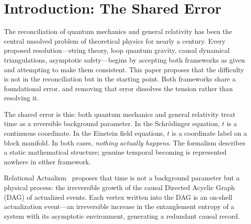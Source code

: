 \documentclass[11pt,a4paper]{article}
\theoremstyle{plain}
\theoremstyle{definition}
\theoremstyle{remark}
\begin{document}
\begin{abstract}
\medskip\noindent
\textbf{Keywords:} Quantum gravity \textperiodcentered{} Causal set theory
\textperiodcentered{} Quantum measure \textperiodcentered{} Causal invariance
\textperiodcentered{} Process ontology \textperiodcentered{}
Bose-Marletto-Vedral \textperiodcentered{} Relational Actualism
\textperiodcentered{} Benincasa-Dowker \textperiodcentered{} Poisson-CSG

\bigskip
\noindent\textbf{New result:} The BDG causal action identifies five
self-similar vertex topology classes that exactly match the Standard Model
particle classification. Confinement of topological classes (quarks and gluons)
with finite BDG-filtration lengths $L=3$ (gluon) and $L=4$ (quark) is proved
via exhaustive extension classification. These results are developed in full in
the companion paper \emph{Relational Actualism: The Topology of Matter}
.

\end{abstract}

\newpage

\section{Introduction: The Shared Error}
\label{sec:intro}

The reconciliation of quantum mechanics and general relativity has been the
central unsolved problem of theoretical physics for nearly a century. Every
proposed resolution---string theory, loop quantum gravity, causal dynamical
triangulations, asymptotic safety---begins by accepting both frameworks as given
and attempting to make them consistent. This paper proposes that the difficulty
is not in the reconciliation but in the starting point. Both frameworks share a
foundational error, and removing that error dissolves the tension rather than
resolving it.

The shared error is this: both quantum mechanics and general relativity treat
time as a reversible background parameter. In the Schr\"{o}dinger equation, $t$
is a continuous coordinate. In the Einstein field equations, $t$ is a coordinate
label on a block manifold. In both cases, \emph{nothing actually happens}. The
formalism describes a static mathematical structure; genuine temporal becoming
is represented nowhere in either framework.

Relational Actualism~\citep{Sandeman2026a} proposes that time is not a background
parameter but a physical process: the irreversible growth of the causal Directed
Acyclic Graph (DAG) of actualized events. Each vertex written into the DAG is an
on-shell actualization event---an irreversible increase in the entanglement entropy
of a system with its asymptotic environment, generating a redundant causal record.
\end{document}
